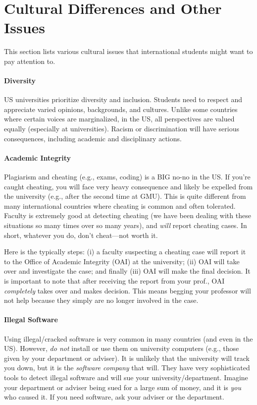 \documentclass[11pt]{article}
\begin{document}
\section{Cultural Differences and Other Issues}\label{sec:cultural}

This section lists various cultural issues that international students might want to pay attention to.

\paragraph{Diversity} US universities prioritize diversity and inclusion. Students need to respect and appreciate varied opinions, backgrounds, and cultures. Unlike some countries where certain voices are marginalized, in the US, all perspectives are valued equally (especially at universities). Racism or discrimination will have serious consequences, including academic and disciplinary actions.

\paragraph{Academic Integrity} Plagiarism and cheating (e.g., exams, coding) is a BIG no-no in the US.  If you're caught cheating, you will face very heavy consequence and likely be expelled from the university (e.g., after the second time at GMU).   This is quite different from many international countries where cheating is common and often tolerated.  Faculty is extremely good at detecting cheating (we have been dealing with these situations so many times over so many years), and \emph{will} report cheating cases.  In short, whatever you do, don't cheat---not worth it.

Here is the typically steps: (i) a faculty suspecting a cheating case will report it to the Office of Academic Integrity (OAI) at the university;  (ii)  OAI will take over and investigate the case; and finally (iii) OAI will make the final decision.  It is important to note that after receiving the report from your prof., OAI \emph{completely} takes over and makes decision.  This means begging your professor will not help because they simply are no longer involved in the case.
    
\paragraph{Illegal Software} Using illegal/cracked software is very common in many countries (and even in the US). However, \emph{do not} install or use them on university computers (e.g., those given by your department or adviser).  It is unlikely that the university will track you down, but it is the \emph{software company} that will.  They have very sophisticated tools to detect illegal software and will sue your university/department.  Imagine your department or adviser being sued for a large sum of money, and it is \emph{you} who caused it.  If you need software, ask your adviser or the department.
\end{document}
